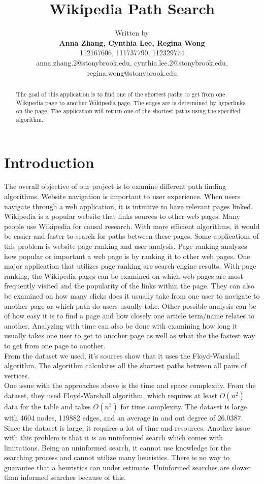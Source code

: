 \documentclass[letterpaper]{article} %
\title{Wikipedia Path Search}
\author{Written by\\ \Large \textbf{Anna Zhang, Cynthia Lee, Regina Wong} \\ %
112167606, 111737790, 112329774\\
anna.zhang.2@stonybrook.edu, cynthia.lee.2@stonybrook.edu, regina.wong@stonybrook.edu %
}
\begin{document}
\maketitle
\begin{abstract}

The goal of this application is to find one of the shortest
paths to get from one Wikipedia page to another Wikipedia page.
The edges are is determined by hyperlinks on the page. The application will return 
one of the shortest paths using the specified algorithm.

\end{abstract}


\section{Introduction}

The overall objective of our project is to examine different path finding algorithms. Website navigation is important to user experience. When users navigate through a web application, it is intuitive to have relevant pages linked. Wikipedia is a popular website that links sources to other web pages. Many people use Wikipedia for causal research. With more efficient algorithms, it would be easier and faster to search for paths between these pages. Some applications of this problem is website page ranking and user analysis. Page ranking analyzes how popular or important a web page is by ranking it to other web pages. One major application that utilizes page ranking are search engine results. With page ranking, the Wikipedia pages can be examined on which web pages are most frequently visited and the popularity of the links within the page. They can also be examined on how many clicks does it usually take from one user to navigate to another page or which path do users usually take. Other possible analysis can be of how easy it is to find a page and how closely one article term/name relates to another. Analyzing with time can also be done with examining how long it usually takes one user to get to another page as well as what the the fastest way to get from one page to another.\\ 

From the dataset we used, it's sources show that it uses the Floyd-Warshall algorithm. The algorithm calculates all the shortest paths between all pairs of vertices. \\

One issue with the approaches above is the time and space complexity. From the dataset, they used Floyd-Warshall algorithm, which requires at least $O(n^2)$ data for the table and takes $O(n^3)$ for time complexity. The dataset is large with 4604 nodes, 119882 edges, and an average in and out degree of 26.0387. Since the dataset is large, it requires a lot of time and resources. Another issue with this problem is that it is an uninformed search which comes with limitations. Being an uninformed search, it cannot use knowledge for the searching process and cannot utilize many heuristics. There is no way to guarantee that a heuristics can under estimate. Uninformed searches are slower than informed searches because of this.\\
\end{document}
